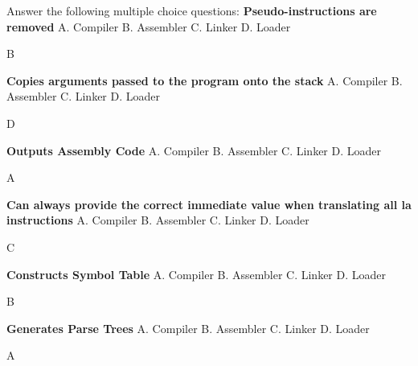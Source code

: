 Answer the following multiple choice questions:
\newline
\textbf{Pseudo-instructions are removed}  \newline
A. Compiler \newline
B. Assembler \newline
C. Linker \newline
D. Loader 

\begin{solution}
    B
\end{solution}

\newline
\newline
\textbf{Copies arguments passed to the program onto the stack}   \newline
A. Compiler \newline
B. Assembler \newline
C. Linker \newline
D. Loader 

\begin{solution}
    D
\end{solution}

\newline
\newline
\textbf{Outputs Assembly Code}   \newline
A. Compiler \newline
B. Assembler \newline
C. Linker \newline
D. Loader 

\begin{solution}
    A
\end{solution}

\newline
\newline
\textbf{Can always provide the correct immediate value when translating all la instructions}   \newline
A. Compiler \newline
B. Assembler \newline
C. Linker \newline
D. Loader 

\begin{solution}
    C
\end{solution}

\newline
\newline
\textbf{Constructs Symbol Table}   \newline
A. Compiler \newline
B. Assembler \newline
C. Linker \newline
D. Loader 

\begin{solution}
    B
\end{solution}

\newline
\newline
\textbf{Generates Parse Trees}   \newline
A. Compiler \newline
B. Assembler \newline
C. Linker \newline
D. Loader 

\begin{solution}
    A
\end{solution}


